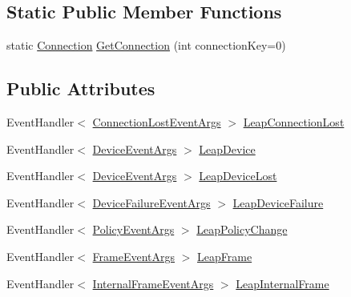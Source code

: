 \subsection*{Static Public Member Functions}
\begin{DoxyCompactItemize}
\item 
static \mbox{\hyperlink{class_leap_internal_1_1_connection}{Connection}} \mbox{\hyperlink{class_leap_internal_1_1_connection_a14b814a88c57b2dafafe72077211aa85}{Get\+Connection}} (int connection\+Key=0)
\end{DoxyCompactItemize}
\subsection*{Public Attributes}
\begin{DoxyCompactItemize}
\item 
Event\+Handler$<$ \mbox{\hyperlink{class_leap_1_1_connection_lost_event_args}{Connection\+Lost\+Event\+Args}} $>$ \mbox{\hyperlink{class_leap_internal_1_1_connection_a352433b853a548790c8ad350e948fdd6}{Leap\+Connection\+Lost}}
\item 
Event\+Handler$<$ \mbox{\hyperlink{class_leap_1_1_device_event_args}{Device\+Event\+Args}} $>$ \mbox{\hyperlink{class_leap_internal_1_1_connection_ae1dd18505f75a72eea2abbeab57d7d01}{Leap\+Device}}
\item 
Event\+Handler$<$ \mbox{\hyperlink{class_leap_1_1_device_event_args}{Device\+Event\+Args}} $>$ \mbox{\hyperlink{class_leap_internal_1_1_connection_a3c55a469e21efe1ceb92b90c636f9f67}{Leap\+Device\+Lost}}
\item 
Event\+Handler$<$ \mbox{\hyperlink{class_leap_1_1_device_failure_event_args}{Device\+Failure\+Event\+Args}} $>$ \mbox{\hyperlink{class_leap_internal_1_1_connection_a8f5dd0ee804342d59a2a28046a2c0e44}{Leap\+Device\+Failure}}
\item 
Event\+Handler$<$ \mbox{\hyperlink{class_leap_1_1_policy_event_args}{Policy\+Event\+Args}} $>$ \mbox{\hyperlink{class_leap_internal_1_1_connection_ac3d23b7ad9ca1224f70f1718873bb1c2}{Leap\+Policy\+Change}}
\item 
Event\+Handler$<$ \mbox{\hyperlink{class_leap_1_1_frame_event_args}{Frame\+Event\+Args}} $>$ \mbox{\hyperlink{class_leap_internal_1_1_connection_a66f84d7e27d1f9a33028ea0abbc89e6c}{Leap\+Frame}}
\item 
Event\+Handler$<$ \mbox{\hyperlink{class_leap_1_1_internal_frame_event_args}{Internal\+Frame\+Event\+Args}} $>$ \mbox{\hyperlink{class_leap_internal_1_1_connection_acbebf064965d68f74d4e851ee1c22bb1}{Leap\+Internal\+Frame}}

\end{DoxyCompactItemize}

